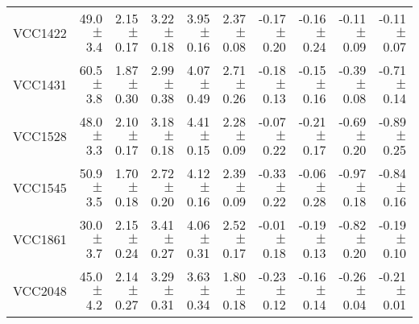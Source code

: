 \documentclass[useAMS,usenatbib]{mn2e}
\begin{document}
\begin{table*}
\begin{threeparttable}
\begin{tabular}{|r|r|r|r|r|r|r|r|r|r|}
VCC1422&       49.0$\pm$       3.4&       2.15$\pm$      0.17&       3.22$\pm$      0.18&       3.95$\pm$      0.16&       2.37$\pm$      0.08&     -0.17$\pm$      0.20&     -0.16$\pm$      0.24&     -0.11$\pm$      0.09&     -0.11$\pm$     0.07\\
VCC1431&       60.5$\pm$       3.8&       1.87$\pm$      0.30&       2.99$\pm$      0.38&       4.07$\pm$      0.49&       2.71$\pm$      0.26&     -0.18$\pm$      0.13&     -0.15$\pm$      0.16&     -0.39$\pm$      0.08&     -0.71$\pm$     0.14\\
VCC1528&       48.0$\pm$       3.3&       2.10$\pm$      0.17&       3.18$\pm$      0.18&       4.41$\pm$      0.15&       2.28$\pm$      0.09&     -0.07$\pm$      0.22&     -0.21$\pm$      0.17&     -0.69$\pm$      0.20&     -0.89$\pm$     0.25\\
VCC1545&       50.9$\pm$       3.5&       1.70$\pm$      0.18&       2.72$\pm$      0.20&       4.12$\pm$      0.16&       2.39$\pm$      0.09&     -0.33$\pm$      0.22&     -0.06$\pm$      0.28&     -0.97$\pm$      0.18&     -0.84$\pm$     0.16\\
VCC1861&       30.0$\pm$       3.7&       2.15$\pm$      0.24&       3.41$\pm$      0.27&       4.06$\pm$      0.31&       2.52$\pm$      0.17&     -0.01$\pm$      0.18&     -0.19$\pm$      0.13&     -0.82$\pm$      0.20&     -0.19$\pm$     0.10\\
VCC2048&       45.0$\pm$       4.2&       2.14$\pm$      0.27&       3.29$\pm$      0.31&       3.63$\pm$      0.34&       1.80$\pm$      0.18&     -0.23$\pm$      0.12&     -0.16$\pm$      0.14&     -0.26$\pm$      0.04&     -0.21$\pm$     0.01\\
\hline
\end{tabular}
\label{resultstable}
\end{threeparttable}
\end{table*}
\end{document}

